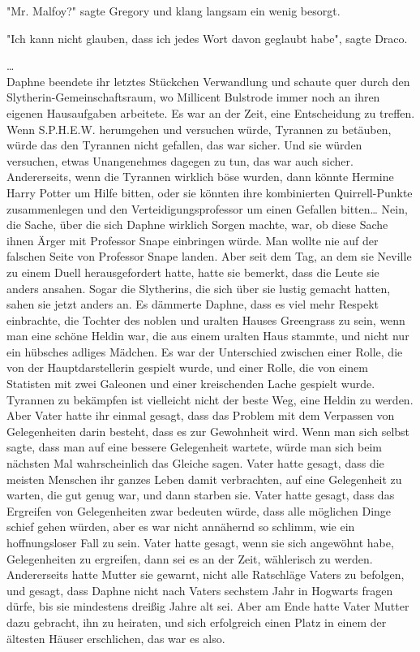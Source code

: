{"Mr. Malfoy?" sagte Gregory und klang langsam ein wenig besorgt.

"Ich kann nicht glauben, dass ich jedes Wort davon geglaubt habe", sagte Draco.

…\\ Daphne beendete ihr letztes Stückchen Verwandlung und schaute quer durch den Slytherin-Gemeinschaftsraum, wo Millicent Bulstrode immer noch an ihren eigenen Hausaufgaben arbeitete. Es war an der Zeit, eine Entscheidung zu treffen. Wenn S.P.H.E.W. herumgehen und versuchen würde, Tyrannen zu betäuben, würde das den Tyrannen nicht gefallen, das war sicher. Und sie würden versuchen, etwas Unangenehmes dagegen zu tun, das war auch sicher. Andererseits, wenn die Tyrannen wirklich böse wurden, dann könnte Hermine Harry Potter um Hilfe bitten, oder sie könnten ihre kombinierten Quirrell-Punkte zusammenlegen und den Verteidigungsprofessor um einen Gefallen bitten… Nein, die Sache, über die sich Daphne wirklich Sorgen machte, war, ob diese Sache ihnen Ärger mit Professor Snape einbringen würde. Man wollte nie auf der falschen Seite von Professor Snape landen. Aber seit dem Tag, an dem sie Neville zu einem Duell herausgefordert hatte, hatte sie bemerkt, dass die Leute sie anders ansahen. Sogar die Slytherins, die sich über sie lustig gemacht hatten, sahen sie jetzt anders an. Es dämmerte Daphne, dass es viel mehr Respekt einbrachte, die Tochter des noblen und uralten Hauses Greengrass zu sein, wenn man eine schöne Heldin war, die aus einem uralten Haus stammte, und nicht nur ein hübsches adliges Mädchen. Es war der Unterschied zwischen einer Rolle, die von der Hauptdarstellerin gespielt wurde, und einer Rolle, die von einem Statisten mit zwei Galeonen und einer kreischenden Lache gespielt wurde. Tyrannen zu bekämpfen ist vielleicht nicht der beste Weg, eine Heldin zu werden. Aber Vater hatte ihr einmal gesagt, dass das Problem mit dem Verpassen von Gelegenheiten darin besteht, dass es zur Gewohnheit wird. Wenn man sich selbst sagte, dass man auf eine bessere Gelegenheit wartete, würde man sich beim nächsten Mal wahrscheinlich das Gleiche sagen. Vater hatte gesagt, dass die meisten Menschen ihr ganzes Leben damit verbrachten, auf eine Gelegenheit zu warten, die gut genug war, und dann starben sie. Vater hatte gesagt, dass das Ergreifen von Gelegenheiten zwar bedeuten würde, dass alle möglichen Dinge schief gehen würden, aber es war nicht annähernd so schlimm, wie ein hoffnungsloser Fall zu sein. Vater hatte gesagt, wenn sie sich angewöhnt habe, Gelegenheiten zu ergreifen, dann sei es an der Zeit, wählerisch zu werden. Andererseits hatte Mutter sie gewarnt, nicht alle Ratschläge Vaters zu befolgen, und gesagt, dass Daphne nicht nach Vaters sechstem Jahr in Hogwarts fragen dürfe, bis sie mindestens dreißig Jahre alt sei. Aber am Ende hatte Vater Mutter dazu gebracht, ihn zu heiraten, und sich erfolgreich einen Platz in einem der ältesten Häuser erschlichen, das war es also.

}
